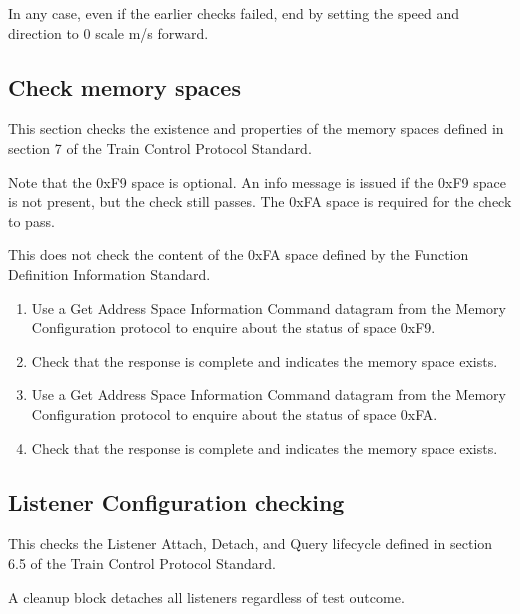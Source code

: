 In any case, even if the earlier checks failed, end by setting the speed 
and direction to 0 scale m/s forward.

\subsection{Check memory spaces}

This section checks the existence and properties of the memory spaces defined in section 7
of the Train Control Protocol Standard.

Note that the 0xF9 space is optional.  An info message is issued if the 0xF9 space
is not present, but the check still passes.  The 0xFA space is required for the check to pass.

This does not check the content of the 0xFA space defined by the 
Function Definition Information Standard.

\begin{enumerate}

\item Use a Get Address Space Information Command datagram from the Memory Configuration protocol
to enquire about the status of space 0xF9.

\item Check that the response is complete and indicates the memory space exists.

\item Use a Get Address Space Information Command datagram from the Memory Configuration protocol
to enquire about the status of space 0xFA.

\item Check that the response is complete and indicates the memory space exists.

\end{enumerate}
    
\subsection{Listener Configuration checking}

This checks the Listener Attach, Detach, and Query lifecycle
defined in section 6.5 of the Train Control Protocol Standard.

A cleanup block detaches all listeners regardless of test outcome.

